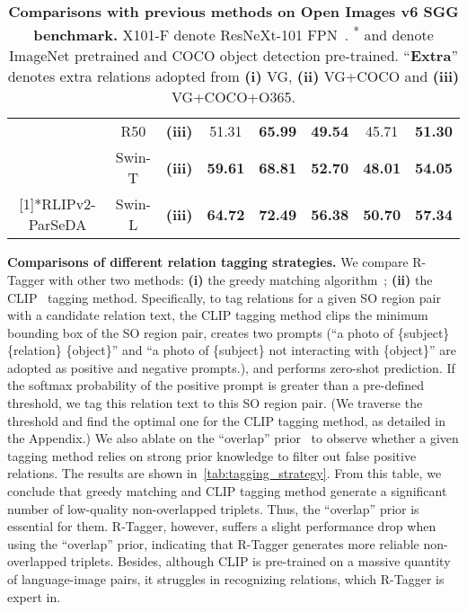 \begin{table}[t]
\begin{tabular}{c|c|c|cc|cc|c}
    \rowcolor{mygray}       & R50   &  \textbf{(iii)} & 51.31  & \textbf{65.99}  & \textbf{49.54}  & 45.71  & \textbf{51.30} \\
    \rowcolor{mygray}       & Swin-T &  \textbf{(iii)} & \textbf{59.61} & \textbf{68.81}  & \textbf{52.70}  & \textbf{48.01}  & \textbf{54.05} \\
\rowcolor{mygray}  \multirow{-7}[1]{*}{RLIPv2-ParSeDA}     & Swin-L   &  \textbf{(iii)} & \textbf{64.72}  & \textbf{72.49}  & \textbf{56.38}  & \textbf{50.70}  & \textbf{57.34} \\
    \bottomrule
    \end{tabular}
    \vspace{-.1cm}
    \caption{\small \textbf{Comparisons with previous methods on Open Images v6 SGG benchmark.} X101-F denote ResNeXt-101 FPN~\cite{xie2017resnext}. \textsuperscript{*} and \textsuperscript{\dag} denote ImageNet pretrained and COCO object detection pre-trained. ``\textbf{Extra}'' denotes extra relations adopted from \textbf{(i)} VG, \textbf{(ii)} VG+COCO and \textbf{(iii)} VG+COCO+O365.}
    \vspace{-.2cm}
  \label{tab:SOTA_SGG}
\end{table}




\textbf{Comparisons of different relation tagging strategies.} 
We compare R-Tagger with other two methods:
\textbf{(i)} the greedy matching algorithm~\cite{zhong2021scene_graph_language};
\textbf{(ii)} the CLIP~\cite{radford2021CLIP} tagging method.
Specifically, to tag relations for a given SO region pair with a candidate relation text, the CLIP tagging method clips the minimum bounding box of the SO region pair, creates two prompts (``a photo of \{subject\} \{relation\} \{object\}'' and ``a photo of \{subject\} not interacting with \{object\}'' are adopted as positive and negative prompts.), and performs zero-shot prediction.
If the {\rm softmax} probability of the positive prompt is greater than a pre-defined threshold, we tag this relation text to this SO region pair.
(We traverse the threshold and find the optimal one for the CLIP tagging method, as detailed in the Appendix.)
We also ablate on the ``overlap'' prior~\cite{zhong2021scene_graph_language} to observe whether a given tagging method relies on strong prior knowledge to filter out false positive relations.
The results are shown in~\cref{tab:tagging_strategy}.
From this table, we conclude that greedy matching and CLIP tagging method generate a significant number of low-quality non-overlapped triplets.
Thus, the ``overlap'' prior is essential for them.
R-Tagger, however, suffers a slight performance drop when using the ``overlap'' prior, indicating that R-Tagger generates more reliable non-overlapped triplets.
Besides, although CLIP is pre-trained on a massive quantity of language-image pairs, it struggles in recognizing relations, which R-Tagger is expert in.



